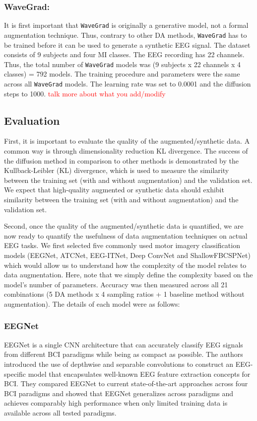 \subsubsection{WaveGrad:}
It is first important that \texttt{WaveGrad} is originally a generative model, not a formal augmentation technique.
Thus, contrary to other DA methods, \texttt{WaveGrad} has to be trained before it can be used to generate a synthetic EEG signal.
The dataset consists of 9 subjects and four MI classes.
The EEG recording has 22 channels.
Thus, the total number of \texttt{WaveGrad} models was (9 subjects x 22 channels x 4 classes) = 792 models.
The training procedure and parameters were the same across all \texttt{WaveGrad} models.
The learning rate was set to 0.0001 and the diffusion steps to 1000.
\textcolor{red}{talk more about what you add/modify}

\subsection{Evaluation}
First, it is important to evaluate the quality of the augmented/synthetic data.
A common way is through dimensionality reduction KL divergence.
The success of the diffusion method in comparison to other methods is demonstrated by the Kullback-Leibler (KL) divergence, which is used to measure the similarity between the training set (with and without augmentation) and the validation set.
We expect that high-quality augmented or synthetic data should exhibit similarity between the training set (with and without augmentation) and the validation set.

Second, once the quality of the augmented/synthetic data is quantified, we are now ready to quantify the usefulness of data augmentation techniques on actual EEG tasks.
We first selected five commonly used motor imagery classification models (EEGNet, ATCNet, EEG-ITNet, Deep ConvNet and ShallowFBCSPNet) which would allow us to understand how the complexity of the model relates to data augmentation.
Here, note that we simply define the complexity based on the model's number of parameters.
Accuracy was then measured across all 21 combinations (5 DA methods x 4 sampling ratios + 1 baseline method without augmentation).
The details of each model were as follows:

\subsubsection{EEGNet}
EEGNet is a single CNN architecture that can accurately classify EEG signals from different BCI paradigms while being as compact as possible.
The authors introduced the use of depthwise and separable convolutions to construct an EEG-specific model that encapsulates well-known EEG feature extraction concepts for BCI.
They compared EEGNet to current state-of-the-art approaches across four BCI paradigms and showed that EEGNet generalizes across paradigms and achieves comparably high performance when only limited training data is available across all tested paradigms.

